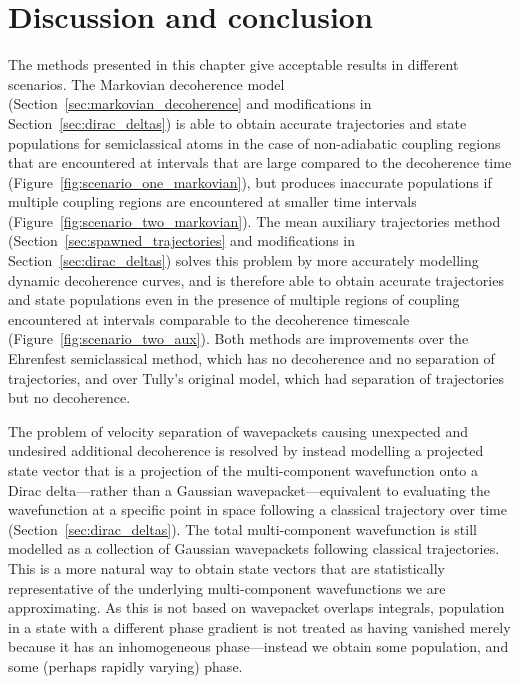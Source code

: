 
\section{Discussion and conclusion}\label{sec:HVSC_discussion}

The methods presented in this chapter give acceptable results in different scenarios. The Markovian decoherence model (Section~\ref{sec:markovian_decoherence} and modifications in Section~\ref{sec:dirac_deltas}) is able to obtain accurate trajectories and state populations for semiclassical atoms in the case of non-adiabatic coupling regions that are encountered at intervals that are large compared to the decoherence time (Figure~\ref{fig:scenario_one_markovian}), but produces inaccurate populations if multiple coupling regions are encountered at smaller time intervals (Figure~\ref{fig:scenario_two_markovian}). The mean auxiliary trajectories method (Section~\ref{sec:spawned_trajectories} and modifications in Section~\ref{sec:dirac_deltas}) solves this problem by more accurately modelling dynamic decoherence curves, and is therefore able to obtain accurate trajectories and state populations even in the presence of multiple regions of coupling encountered at intervals comparable to the decoherence timescale (Figure~\ref{fig:scenario_two_aux}). Both methods are improvements over the Ehrenfest semiclassical method, which has no decoherence and no separation of trajectories, and over Tully's original model, which had separation of trajectories but no decoherence. 

The problem of velocity separation of wavepackets causing unexpected and undesired additional decoherence is resolved by instead modelling a projected state vector that is a projection of the multi-component wavefunction onto a Dirac delta---rather than a Gaussian wavepacket---equivalent to evaluating the wavefunction at a specific point in space following a classical trajectory over time (Section~\ref{sec:dirac_deltas}). The total multi-component wavefunction is still modelled as a collection of Gaussian wavepackets following classical trajectories. This is a more natural way to obtain state vectors that are statistically representative of the underlying multi-component wavefunctions we are approximating. As this is not based on wavepacket overlaps integrals, population in a state with a different phase gradient is not treated as having vanished merely because it has an inhomogeneous phase---instead we obtain some population, and some (perhaps rapidly varying) phase.

